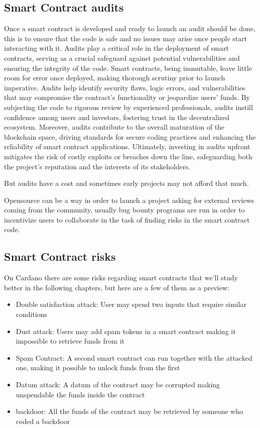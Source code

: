 \subsection{Smart Contract audits}

Once a smart contract is developed and ready to launch an audit should be done, this is to ensure that the code is safe and no issues may arise once people start interacting with it.
Audits play a critical role in the deployment of smart contracts, serving as a crucial safeguard against potential vulnerabilities and ensuring the integrity of the code.
Smart contracts, being immutable, leave little room for error once deployed, making thorough scrutiny prior to launch imperative.
Audits help identify security flaws, logic errors, and vulnerabilities that may compromise the contract's functionality or jeopardize users' funds.
By subjecting the code to rigorous review by experienced professionals, audits instill confidence among users and investors, fostering trust in the decentralized ecosystem. Moreover, audits contribute to the overall maturation of the blockchain space, driving standards for secure coding practices and enhancing the reliability of smart contract applications.
Ultimately, investing in audits upfront mitigates the risk of costly exploits or breaches down the line, safeguarding both the project's reputation and the interests of its stakeholders.

But audits have a cost and sometimes early projects may not afford that much.

Opensource can be a way in order to launch a project asking for external reviews coming from the community, usually bug bounty programs are run in order to incentivize users to collaborate in the task of finding risks in the smart contract code.

\subsection{Smart Contract risks}

On Cardano there are some risks regarding smart contracts that we'll study better in the following chapters, but here are a few of them as a preview:

\begin{itemize}
  \item Double satisfaction attack: User may spend two inputs that require similar conditions
  \item Dust attack: Users may add spam tokens in a smart contract making it impossible to retrieve funds from it
  \item Spam Contract: A second smart contract can run together with the attacked one, making it possible to unlock funds from the first
  \item Datum attack: A datum of the contract may be corrupted making unspendable the funds inside the contract
  \item backdoor: All the funds of the contract may be retrieved by someone who coded a backdoor
\end{itemize}

